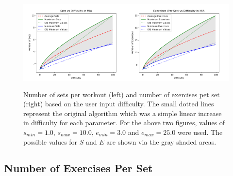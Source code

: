 \begin{figure}[h]
	\centering
	\includegraphics[width=0.5\textwidth]{images/Svd.png}\includegraphics[width=0.5\textwidth]{images/Evd.png}
	\caption{Number of sets per workout (left) and number of exercises pet set (right) based on the user input difficulty. The small dotted lines represent the original algorithm which was a simple linear increase in difficulty for each parameter. For the above two figures, values of $s_{min}=1.0$, $s_{max} = 10.0$, $e_{min}=3.0$ and $e_{max}=25.0$ were used. The possible values for $S$ and $E$ are shown via the gray shaded areas.} \label{Svd and Evd}
\end{figure}

\subsection{Number of Exercises Per Set}

